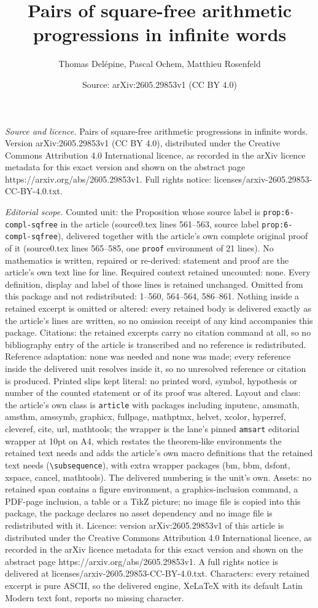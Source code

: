 \documentclass[10pt,a4paper]{amsart}
\title[Pairs of square-free arithmetic progressions in infinite wor]{Pairs of square-free arithmetic progressions in infinite words}
\author{Thomas Del\'epine, Pascal Ochem, Matthieu Rosenfeld}
\date{Source: arXiv:2605.29853v1 (CC BY 4.0)}
\begin{document}
\maketitle

\noindent\emph{Source and licence.} Pairs of square-free arithmetic progressions in infinite words. Version arXiv:2605.29853v1 (CC BY 4.0), distributed under the Creative Commons Attribution 4.0 International licence, as recorded in the arXiv licence metadata for this exact version and shown on the abstract page https://arxiv.org/abs/2605.29853v1. Full rights notice: licenses/arxiv-2605.29853-CC-BY-4.0.txt.\par\smallskip

\noindent\textit{Editorial scope.} Counted unit: the Proposition whose source label is \texttt{prop:6-compl-sqfree} in the article (source0.tex lines 561--563, source label \texttt{prop:6-compl-sqfree}), delivered together with the article's own complete original proof of it (source0.tex lines 565--585, one \texttt{proof} environment of 21 lines). No mathematics is written, repaired or re-derived: statement and proof are the article's own text line for line. Required context retained uncounted: none. Every definition, display and label of those lines is retained unchanged. Omitted from this package and not redistributed: 1--560, 564--564, 586--861. Nothing inside a retained excerpt is omitted or altered: every retained body is delivered exactly as the article's lines are written, so no omission receipt of any kind accompanies this package. Citations: the retained excerpts carry no citation command at all, so no bibliography entry of the article is transcribed and no reference is redistributed. Reference adaptation: none was needed and none was made; every reference inside the delivered unit resolves inside it, so no unresolved reference or citation is produced. Printed slips kept literal: no printed word, symbol, hypothesis or number of the counted statement or of its proof was altered. Layout and class: the article's own class is \texttt{article} with packages including inputenc, amsmath, amsthm, amssymb, graphicx, fullpage, mathptmx, helvet, xcolor, hyperref, cleveref, cite, url, mathtools; the wrapper is the lane's pinned \texttt{amsart} editorial wrapper at 10pt on A4, which restates the theorem-like environments the retained text needs and adds the article's own macro definitions that the retained text needs (\texttt{\textbackslash subsequence}), with extra wrapper packages (bm, bbm, dsfont, xspace, cancel, mathtools). The delivered numbering is the unit's own. Assets: no retained span contains a figure environment, a graphics-inclusion command, a PDF-page inclusion, a table or a TikZ picture; no image file is copied into this package, the package declares no asset dependency and no image file is redistributed with it. Licence: version arXiv:2605.29853v1 of this article is distributed under the Creative Commons Attribution 4.0 International licence, as recorded in the arXiv licence metadata for this exact version and shown on the abstract page https://arxiv.org/abs/2605.29853v1. A full rights notice is delivered at licenses/arxiv-2605.29853-CC-BY-4.0.txt. Characters: every retained excerpt is pure ASCII, so the delivered engine, XeLaTeX with its default Latin Modern text font, reports no missing character.
\end{document}
